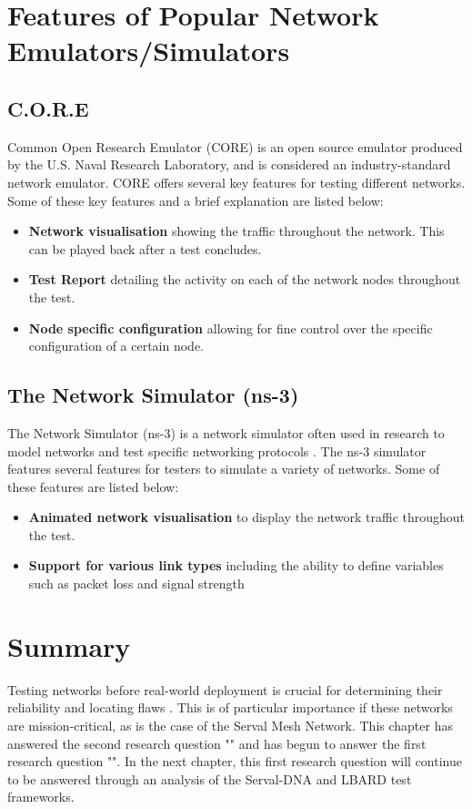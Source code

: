 \section{Features of Popular Network Emulators/Simulators}
\subsection{C.O.R.E}
Common Open Research Emulator (CORE) is an open source emulator produced by the U.S. Naval Research Laboratory, and is considered an industry-standard network emulator. 
CORE offers several key features for testing different networks. Some of these key features and a brief explanation are listed below:
\begin{itemize}
    \item \textbf{Network visualisation} showing the traffic throughout the network. This can be played back after a test concludes.
    \item \textbf{Test Report} detailing the activity on each of the network nodes throughout the test.
    \item \textbf{Node specific configuration} allowing for fine control over the specific configuration of a certain node.
\end{itemize}

\subsection{The Network Simulator (ns-3)}
The Network Simulator (ns-3) is a network simulator often used in research to model networks and test specific networking protocols \parencite{modellingAndTools2010}.
The ns-3 simulator features several features for testers to simulate a variety of networks. Some of these features are listed below:
\begin{itemize}
    \item \textbf{Animated network visualisation} to display the network traffic throughout the test.
    \item \textbf{Support for various link types} including the ability to define variables such as packet loss and signal strength
\end{itemize}


\section{Summary}
Testing networks before real-world deployment is crucial for determining their reliability and locating flaws \parencite{predeploymentTesting2006}.
This is of particular importance if these networks are mission-critical, as is the case of the Serval Mesh Network.
This chapter has answered the second research question "\secondRQ" and has begun to answer the first research question "\firstRQ".
In the next chapter, this first research question will continue to be answered through an analysis of the Serval-DNA and LBARD test frameworks.
